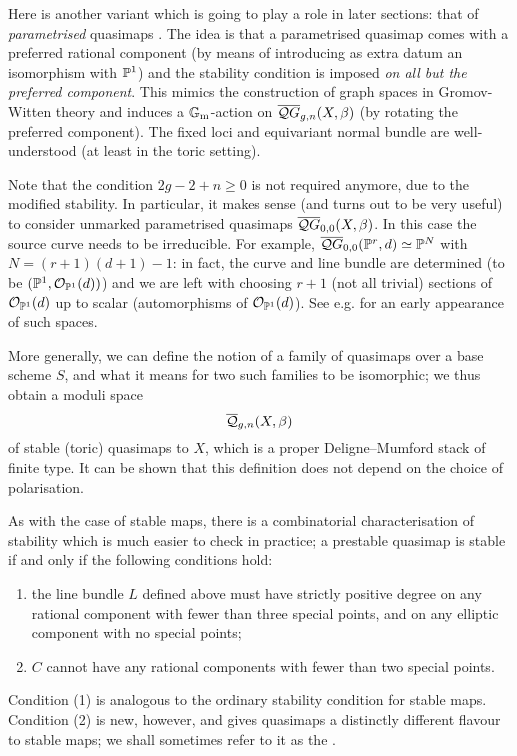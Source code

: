 \begin{remark}
 Here is another variant which is going to play a role in later sections: that of \emph{parametrised} quasimaps \cite[\S 7]{CF-K}. The idea is that a parametrised quasimap comes with a preferred rational component (by means of introducing as extra datum an isomorphism with $\mathbb P^1$) and the stability condition is imposed \emph{on all but the preferred component}. This mimics the construction of graph spaces in Gromov-Witten theory and induces a $\mathbb{G}_{\text{m}}$-action on $\overline{\mathcal QG}_{g,n}(X,\beta)$ (by rotating the preferred component). The fixed loci and equivariant normal bundle are well-understood (at least in the toric setting).
 
 Note that the condition $2g-2+n\geq 0$ is not required anymore, due to the modified stability. In particular, it makes sense (and turns out to be very useful) to consider unmarked parametrised quasimaps $\overline{\mathcal QG}_{0,0}(X,\beta)$. In this case the source curve needs to be irreducible. For example, $\overline{\mathcal QG}_{0,0}(\mathbb P^r,d)\simeq\mathbb P^N$ with $N=(r+1)(d+1)-1$: in fact, the curve and line bundle are determined (to be $(\mathbb P^1,\mathcal O_{\mathbb P^1}(d))$) and we are left with choosing $r+1$ (not all trivial) sections of $\mathcal O_{\mathbb P^1}(d)$ up to scalar (automorphisms of $\mathcal O_{\mathbb P^1}(d)$). See e.g. \cite{Bertram} for an early appearance of such spaces.
\end{remark}


More generally, we can define the notion of a family of quasimaps over a base scheme $S$, and what it means for two such families to be isomorphic; we thus obtain a moduli space
\begin{equation*} \overline{\mathcal Q}_{g,n}(X,\beta) \end{equation*}
of stable (toric) quasimaps to $X$, which is a proper Deligne--Mumford stack of finite type. It can be shown that this definition does not depend on the choice of polarisation.


As with the case of stable maps, there is a combinatorial characterisation of stability which is much easier to check in practice; a prestable quasimap is stable if and only if the following conditions hold:
\begin{enumerate}
\item the line bundle $L$ defined above must have strictly positive degree on any rational component with fewer than three special points, and on any elliptic component with no special points;
\item $C$ cannot have any rational components with fewer than two special points.
\end{enumerate}
Condition (1) is analogous to the ordinary stability condition for stable maps. Condition (2) is new, however, and gives quasimaps a distinctly different flavour to stable maps; we shall sometimes refer to it as the . 

